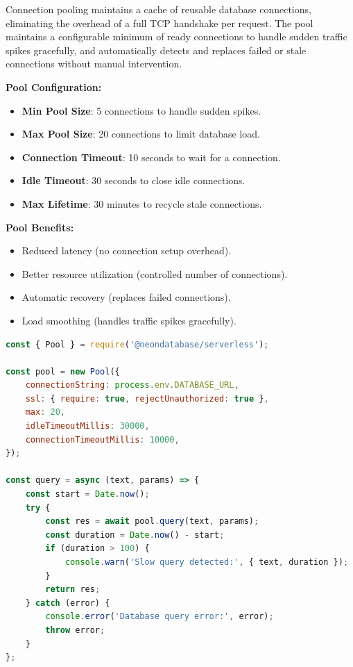 \justifying
Connection pooling maintains a cache of reusable database connections, eliminating the
overhead of a full TCP handshake per request. The pool maintains a configurable minimum
of ready connections to handle sudden traffic spikes gracefully, and automatically detects
and replaces failed or stale connections without manual intervention.

\textbf{Pool Configuration:}
\begin{itemize}
    \item \textbf{Min Pool Size}: 5 connections to handle sudden spikes.
    \item \textbf{Max Pool Size}: 20 connections to limit database load.
    \item \textbf{Connection Timeout}: 10 seconds to wait for a connection.
    \item \textbf{Idle Timeout}: 30 seconds to close idle connections.
    \item \textbf{Max Lifetime}: 30 minutes to recycle stale connections.
\end{itemize}

\textbf{Pool Benefits:}
\begin{itemize}
    \item Reduced latency (no connection setup overhead).
    \item Better resource utilization (controlled number of connections).
    \item Automatic recovery (replaces failed connections).
    \item Load smoothing (handles traffic spikes gracefully).
\end{itemize}

\begin{lstlisting}[language=JavaScript,
    caption={Database Connection Configuration (config/database.js)},
    label={lst:dbconfig},
    breaklines=true,
    columns=flexible,
    keepspaces=true]
const { Pool } = require('@neondatabase/serverless');

const pool = new Pool({
    connectionString: process.env.DATABASE_URL,
    ssl: { require: true, rejectUnauthorized: true },
    max: 20,
    idleTimeoutMillis: 30000,
    connectionTimeoutMillis: 10000,
});

const query = async (text, params) => {
    const start = Date.now();
    try {
        const res = await pool.query(text, params);
        const duration = Date.now() - start;
        if (duration > 100) {
            console.warn('Slow query detected:', { text, duration });
        }
        return res;
    } catch (error) {
        console.error('Database query error:', error);
        throw error;
    }
};
\end{lstlisting}

